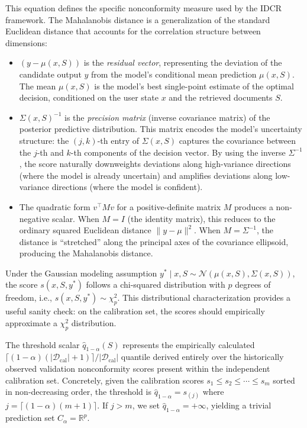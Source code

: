 \documentclass[12pt,a4paper,oneside]{report}
\theoremstyle{definition}
\theoremstyle{remark}
\begin{document}
\medskip
\noindent This equation defines the specific nonconformity measure used by the IDCR framework. The Mahalanobis distance is a generalization of the standard Euclidean distance that accounts for the correlation structure between dimensions:

\begin{itemize}[leftmargin=2em]
  \item $(y - \mu(x,S))$ is the \emph{residual vector}, representing the deviation of the candidate output $y$ from the model's conditional mean prediction $\mu(x,S)$. The mean $\mu(x,S)$ is the model's best single-point estimate of the optimal decision, conditioned on the user state $x$ and the retrieved documents $S$.
  \item $\Sigma(x, S)^{-1}$ is the \emph{precision matrix} (inverse covariance matrix) of the posterior predictive distribution. This matrix encodes the model's uncertainty structure: the $(j,k)$-th entry of $\Sigma(x,S)$ captures the covariance between the $j$-th and $k$-th components of the decision vector. By using the inverse $\Sigma^{-1}$, the score naturally downweights deviations along high-variance directions (where the model is already uncertain) and amplifies deviations along low-variance directions (where the model is confident).
  \item The quadratic form $v^\top M v$ for a positive-definite matrix $M$ produces a non-negative scalar. When $M = I$ (the identity matrix), this reduces to the ordinary squared Euclidean distance $\|y - \mu\|^2$. When $M = \Sigma^{-1}$, the distance is ``stretched'' along the principal axes of the covariance ellipsoid, producing the Mahalanobis distance.
\end{itemize}

\noindent Under the Gaussian modeling assumption $y^* \mid x, S \sim \mathcal{N}(\mu(x,S), \Sigma(x,S))$, the score $s(x,S,y^*)$ follows a chi-squared distribution with $p$ degrees of freedom, i.e., $s(x,S,y^*) \sim \chi^2_p$. This distributional characterization provides a useful sanity check: on the calibration set, the scores should empirically approximate a $\chi^2_p$ distribution.

\medskip
\noindent The threshold scalar $\hat{q}_{1-\alpha}(S)$ represents the empirically calculated $\lceil(1-\alpha)(|\mathcal{D}_{\text{cal}}| + 1)\rceil / |\mathcal{D}_{\text{cal}}|$ quantile derived entirely over the historically observed validation nonconformity scores present within the independent calibration set. Concretely, given the calibration scores $s_1 \leq s_2 \leq \cdots \leq s_m$ sorted in non-decreasing order, the threshold is $\hat{q}_{1-\alpha} = s_{(j)}$ where $j = \lceil (1-\alpha)(m+1) \rceil$. If $j > m$, we set $\hat{q}_{1-\alpha} = +\infty$, yielding a trivial prediction set $C_{\alpha} = \mathbb{R}^p$.
\end{document}
